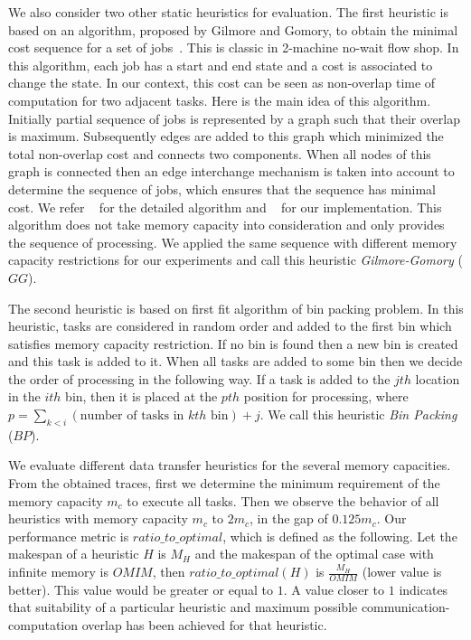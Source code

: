 \documentclass[sigconf]{acmart}
\begin{document}
{		%
		We also consider two other static heuristics for evaluation. The first heuristic is based on an algorithm, proposed by Gilmore and Gomory, to obtain the minimal cost sequence for a set of jobs~\cite{Gilmore-Gomory:1964}. This is classic in 2-machine no-wait flow shop. In this algorithm, each job has a start and end state and a cost is associated to change the state. In our context, this cost can be seen as non-overlap time of computation for two adjacent tasks. Here is the main idea of this algorithm. Initially partial sequence of jobs is represented by a graph such that their overlap is maximum. Subsequently edges are added to this graph which minimized the total non-overlap cost and connects two components. When all nodes of this graph is connected then an edge interchange mechanism is taken into account to determine the sequence of jobs, which ensures that the sequence has minimal cost. We refer ~\cite{Gilmore-Gomory:1964} for the detailed algorithm and ~\cite{gitworkrepo} for our implementation. This algorithm does not take memory capacity into consideration and only provides the sequence of processing. We applied the same sequence with different memory capacity restrictions for our experiments and call this heuristic \textit{Gilmore-Gomory} ($GG$).
		
		The second heuristic is based on first fit algorithm of bin packing problem. In this heuristic, tasks are considered in random order and added to the first bin which satisfies memory capacity restriction. If no bin is found then a new bin is created and this task is added to it. When all tasks are added to some bin then we decide the order of processing in the following way. If a task is added to the $jth$ location in the $ith$ bin, then it is placed at the $pth$ position for processing, where $p=\sum_{k<i}(\text{number of tasks in $kth$ bin}) + j$. We call this heuristic \textit{Bin Packing} ($BP$). 
		
		
		
		We evaluate different data transfer heuristics for the several memory capacities. From the obtained traces, first we determine the minimum requirement of the memory capacity $m_c$ to execute all tasks. Then we observe the behavior of all heuristics with memory capacity $m_c$ to $2m_c$, in the gap of $0.125m_c$. Our performance metric is $ratio\_to\_optimal$, which is defined as the following. Let the makespan of a heuristic $H$ is $M_H$ and the makespan of the optimal case with infinite memory is $OMIM$, then $ratio\_to\_optimal (H)$ is $\frac{M_H}{OMIM}$ (lower value is better). This value would be greater or equal to $1$. A value closer to $1$ indicates that suitability of a particular heuristic and maximum possible communication-computation overlap has been achieved for that heuristic.
		
}
\end{document}
